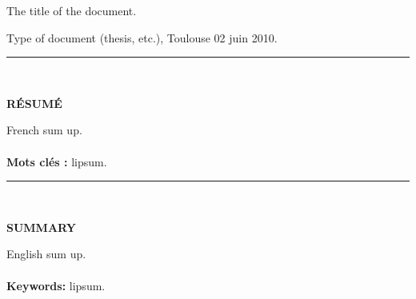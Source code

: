 \begin{vcenterpage}
\thispagestyle{empty} %
The title of the document.

\vspace*{0.5cm}

Type of document (thesis, etc.), Toulouse 02 juin 2010.

\vspace*{1cm}

\noindent\rule[2pt]{\textwidth}{0.5pt}
\\
\begin{center}
{\large\textbf{R\'ESUM\'E}}
\end{center}
French sum up.
\\
\\
{\large\textbf{Mots clés :}}
lipsum.

\vspace*{1cm}

\noindent\rule[2pt]{\textwidth}{0.5pt}
\\
\begin{center}
{\large\textbf{SUMMARY}}
\end{center}
English sum up.
\\
\\
{\large\textbf{Keywords:}}
lipsum.
\\
\end{vcenterpage}
